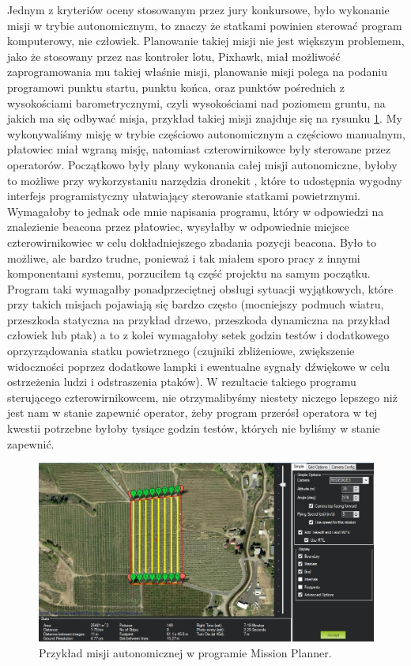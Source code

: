 Jednym z kryteriów oceny stosowanym przez jury konkursowe, było wykonanie misji w trybie autonomicznym, to znaczy że statkami powinien sterować program komputerowy, nie człowiek. Planowanie takiej misji nie jest większym problemem, jako że stosowany przez nas kontroler lotu, Pixhawk, miał możliwość zaprogramowania mu takiej właśnie misji, planowanie misji polega na podaniu programowi punktu startu, punktu końca, oraz punktów pośrednich z wysokościami barometrycznymi, czyli wysokościami nad poziomem gruntu, na jakich ma się odbywać misja, przykład takiej misji znajduje się na rysunku \ref{fig:misja}. My wykonywaliśmy misję w trybie częściowo autonomicznym a częściowo manualnym, płatowiec miał wgraną misję, natomiast czterowirnikowce były sterowane przez operatorów. Początkowo były plany wykonania całej misji autonomiczne, byłoby to możliwe przy wykorzystaniu narzędzia dronekit \cite{dronekit}, które to udostępnia wygodny interfejs programistyczny ułatwiający sterowanie statkami powietrznymi. Wymagałoby to jednak ode mnie napisania programu, który w odpowiedzi na znalezienie beacona przez płatowiec, wysyłałby w odpowiednie miejsce czterowirnikowiec w celu dokładniejszego zbadania pozycji beacona. Było to możliwe, ale bardzo trudne, ponieważ i tak miałem sporo pracy z innymi komponentami systemu, porzuciłem tą część projektu na samym początku. Program taki wymagałby ponadprzeciętnej obsługi sytuacji wyjątkowych, które przy takich misjach pojawiają się bardzo często (mocniejszy podmuch wiatru, przeszkoda statyczna na przykład drzewo, przeszkoda dynamiczna na przykład człowiek lub ptak) a to z kolei wymagałoby setek godzin testów i dodatkowego oprzyrządowania statku powietrznego (czujniki zbliżeniowe, zwiększenie widoczności poprzez dodatkowe lampki i ewentualne sygnały dźwiękowe w celu ostrzeżenia ludzi i odstraszenia ptaków). W rezultacie takiego programu sterującego czterowirnikowcem, nie otrzymalibyśmy niestety niczego lepszego niż jest nam w stanie zapewnić operator, żeby program przerósł operatora w tej kwestii potrzebne byłoby tysiące godzin testów, których nie byliśmy w stanie zapewnić.

\begin{figure}[!th]
    \centering
    \includegraphics[width=15cm]{zalaczniki/obrazy/misja.jpg}
    \caption{Przykład misji autonomicznej w programie Mission Planner.}
    \label{fig:misja}
\end{figure}

